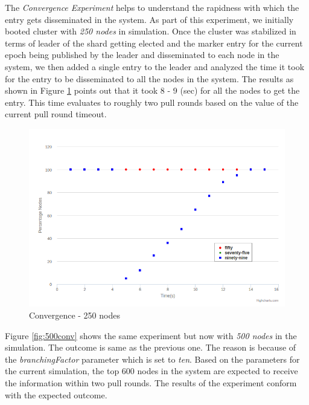 \documentclass[a4paper,11pt]{kth-mag}
\begin{document}
The \textit{Convergence Experiment} helps to understand the rapidness with which the entry gets disseminated in the system. As part of this experiment, we initially booted cluster with \textit{250 nodes} in simulation. Once the cluster was stabilized in terms of leader of the shard getting elected and the marker entry for the current epoch being published by the leader and disseminated to each node in the system, we then added a single entry to the leader and analyzed the time it took for the entry to be disseminated to all the nodes in the system. The results as shown in Figure \ref{fig:250conv} points out that it took 8 - 9 (sec) for all the nodes to get the entry. This time evaluates to roughly two pull rounds based on the value of the current pull round timeout.

\begin{figure}[h]
	\includegraphics[scale=0.5]{250Convergence}
	\caption{Convergence - 250 nodes}
	\label{fig:250conv}
\end{figure}


Figure \ref{fig:500conv} shows the same experiment but now with \textit{500 nodes} in the simulation. The outcome is same as the previous one. The reason is because of the \textit{branchingFactor} parameter which is set to \textit{ten}. Based on the parameters for the current simulation, the top 600 nodes in the system are expected to receive the information within two pull rounds. The results of the experiment conform with the expected outcome.
\end{document}
